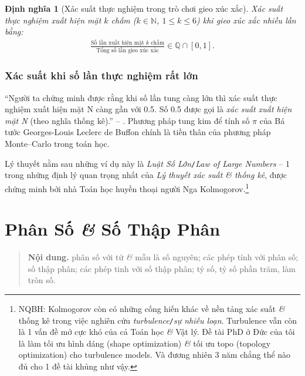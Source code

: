 \documentclass[oneside]{book}
\numberwithin{equation}{section}
\newtheorem{dinhnghia}{Định nghĩa}[section]
\begin{document}
\begin{dinhnghia}[Xác suất thực nghiệm trong trò chơi gieo xúc xắc]
	\emph{Xác suất thực nghiệm xuất hiện mặt $k$ chấm} ($k\in\mathbb{N}$, $1\le k\le 6$) khi gieo xúc xắc nhiều lần bằng:
	\begin{align*}
		\frac{\mbox{Số lần xuất hiện mặt $k$ chấm}}{\mbox{Tổng số lần gieo xúc xắc}}\in\mathbb{Q}\cap[0,1].
	\end{align*}
\end{dinhnghia}

\subsection{Xác suất khi số lần thực nghiệm rất lớn}
``Người ta chứng minh được rằng khi số lần tung càng lớn thì xác suất thực nghiệm xuất hiện mặt N càng gần với 0.5. Số 0.5 được gọi là \textit{xác suất xuất hiện mặt N} (theo nghĩa thống kê).'' -- \cite[p. 21]{Thai_Anh_Dat_Ha_Loan_Nam_Quang_Toan_6_tap_2}. Phương pháp tung kim để tính số $\pi$ của Bá tước Georges-Louis Leclerc de Buffon chính là tiền thân của phương pháp Monte--Carlo trong toán học.

Lý thuyết nằm sau những ví dụ này là \textit{Luật Số Lớn}\texttt{/}\textit{Law of Large Numbers} -- 1 trong những định lý quan trọng nhất của \textit{Lý thuyết xác suất \textit{\&} thống kê}, được chứng minh bởi nhà Toán học huyền thoại người Nga Kolmogorov.\footnote{NQBH: Kolmogorov còn có những cống hiến khác về nền tảng xác suất \textit{\&} thống kê trong việc nghiên cứu \textit{turbulence}\texttt{/}\textit{sự nhiễu loạn}. Turbulence vẫn còn là 1 vấn đề mở cực khó của cả Toán học \textit{\&} Vật lý. Đề tài PhD ở Đức của tôi là làm tối ưu hình dáng (shape optimization) \textit{\&} tối ưu topo (topology optimization) cho turbulence models. Và đương nhiên 3 năm chẳng thể nào đủ cho 1 đề tài khủng như vậy.}

\chapter{Phân Số \textit{\&} Số Thập Phân}

\begin{quotation}
	\textbf{Nội dung.} phân số với tử \textit{\&} mẫu là số nguyên; các phép tính với phân số; số thập phân; các phép tinh với số thập phân; tỷ số, tỷ số phần trăm, làm tròn số.
\end{quotation}

\end{document}
